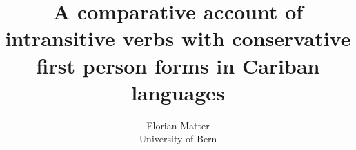 \newcommand{\kaxone}{\\\small\begin{tabular}{@{}rllll@{}}
& \gl{a} & \gl{s_a_} & \gl{s_p_} & \gl{p}\\
\gl{1} & \obj{w-} & \obj{w-} & \obj{k-}, Ø/\obj{j-} & Ø/\obj{j-}\\
\gl{2} & \obj{m-} & \obj{m-} & \obj{o-} & \obj{o-}\\
\gl{1+2} & \obj{kɨt-} & \obj{kɨt-} & \obj{k-}, \obj{kɨt-} & \obj{k-}\\
\end{tabular}}

\newcommand{\pwone}{\\\small\begin{tabular}{@{}rllll@{}}
& \gl{a} & \gl{s_a_} & \gl{s_p_} & \gl{p}\\
\gl{1} & \rc{w-} & \emp{\rc{k-}} & \rc{k-} & \emp{\rc{owɨ(ro) j-}}\\
\gl{2} & \rc{m-} & \rc{m-} & \rc{o(j)-} & \rc{o(j)-}\\
\gl{1+2} & \rc{tɨt-} & \rc{tɨt-} & \rc{tɨt-} & \rc{k-}\\
\end{tabular}}

\newcommand{\hixone}{\\\small\begin{tabular}{@{}rllll@{}}
& \gl{a} & \gl{s_a_} & \gl{s_p_} & \gl{p}\\
\gl{1} & \obj{w-}/\obj{ɨ-} & \obj{k-} & \obj{k-} & \obj{r(o)-}\\
\gl{2} & \obj{m-} & \obj{m-} & \obj{o(j)-} & \obj{o(j)-}\\
\gl{1+2} & \obj{t-} & \obj{t-} & \obj{t-} & \obj{k-}\\
\end{tabular}}

\newcommand{\waione}{\\\small\begin{tabular}{@{}rllll@{}}
& \gl{a} & \gl{s_a_} & \gl{s_p_} & \gl{p}\\
\gl{1} & \obj{w-} & \obj{k-} & \obj{k-} & \obj{o(j)-}\\
\gl{2} & \obj{m-} & \obj{m-} & \emp{\obj{m-}} & \obj{a(w)-}\\
\gl{1+2} & \obj{t(ɨt)-} & \obj{t(ɨt)-} & \obj{t(ɨt)-} & \obj{k-}\\
\end{tabular}}

\title{A comparative account of intransitive verbs with conservative first person forms in Cariban languages}
\author{Florian Matter \\ University of Bern}


